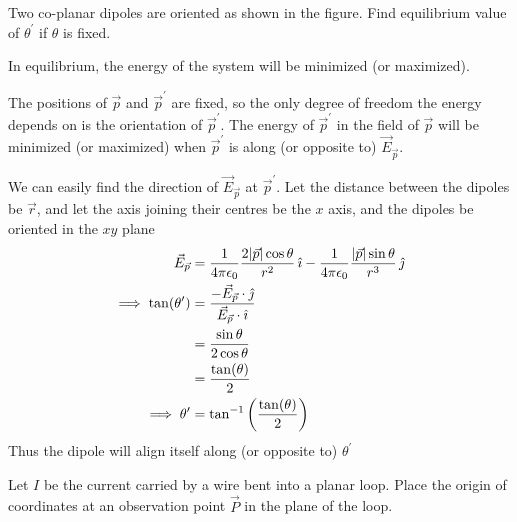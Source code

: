 \documentclass[../main.tex]{subfiles}
\begin{document}
\begin{questions}

\question Two co-planar dipoles are oriented as shown in the figure. Find equilibrium value of $\theta^\prime$ if $\theta$ is fixed.
\begin{center}
\end{center}
\begin{solution}
	In equilibrium, the energy of the system will be minimized (or maximized).

	The positions of $\vec{p}$ and $\vec{p}^\prime$ are fixed, so the only degree of freedom the energy depends on is the orientation of $\vec{p}^\prime$. The energy of $\vec{p}^\prime$ in the field of $\vec{p}$ will be minimized (or maximized) when $\vec{p}^\prime$ is along (or opposite to) $\vec{E}_{\vec{p}}$.

	We can easily find the direction of $\vec{E}_{\vec{p}}$ at $\vec{p}^\prime$. Let the distance between the dipoles be $\vec{r}$, and let the axis joining their centres be the $x$ axis, and the dipoles be oriented in the $xy$ plane
	\begin{align}
		\vec{E}_{\vec{p}} &= \frac{1}{4\pi\epsilon_0}\frac{2|\vec{p}|\cos\theta}{r^2}\,\hat{\imath} - \frac{1}{4\pi\epsilon_0}\frac{|\vec{p}|\sin\theta}{r^3}\,\hat{\jmath}\\
		\implies \tan(\theta^\prime) &= \frac{-\vec{E}_{\vec{p}}\cdot \hat{\jmath}}{\vec{E}_{\vec{p}}\cdot \hat{\imath}}\\
		&= \frac{\sin\theta}{2\cos\theta}\\
		&= \frac{\tan(\theta)}{2}\\
		\implies \theta^\prime &= \tan^{-1}\left(\frac{\tan(\theta)}{2}\right)
	\end{align}
	Thus the dipole will align itself along (or opposite to) $\theta^\prime$
\end{solution}

\question Let $I$ be the current carried by a wire bent into a planar loop. Place the origin of coordinates at an observation point $\vec{P}$ in the plane of the loop.
\label{q:mag}
\begin{parts}

\end{parts}
\end{questions}
\end{document}
